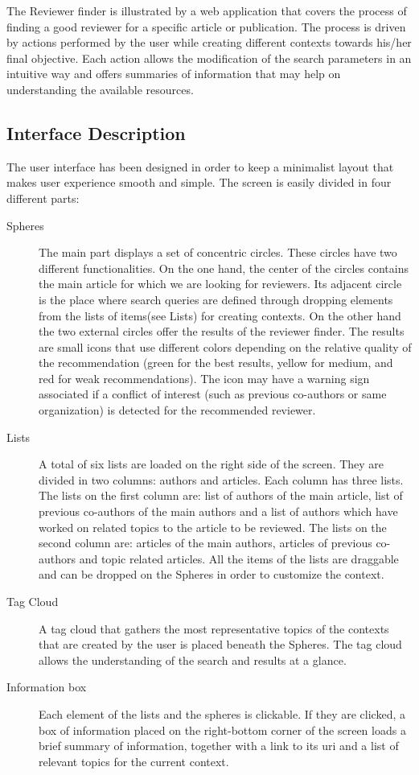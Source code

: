 The Reviewer finder is illustrated by a web application that covers the process
of finding a good reviewer for a specific article or publication. The process is
driven by actions performed by the user while creating different contexts
towards his/her final objective. Each action allows the modification of the
search parameters in an intuitive way and offers summaries of information that
may help on understanding the available resources.\\
\subsection{Interface Description}
The user interface has been designed in order to keep a minimalist layout that
makes user experience smooth and simple. The screen is easily divided in four
different parts:
\begin{description}
\item[Spheres]The main part displays a set of concentric circles. These circles
have two different functionalities. On the one hand, the center of the circles
contains the main article for which we are looking for reviewers. Its adjacent
circle is the place where search queries are defined through dropping elements
from the lists of items(see Lists) for creating contexts. On the other hand the
two external circles offer the results of the reviewer finder. The results are
small icons that use different colors depending on the relative quality of the
recommendation (green for the best results, yellow for medium, and red for weak
recommendations). The icon may have a warning sign associated if a conflict of
interest (such as previous co-authors or same organization) is detected for the
recommended reviewer.
\item[Lists]A total of six lists are loaded on the right side of the screen.
They are divided in two columns: authors and articles. Each column has three
lists. The lists on the first column are: list of authors of the main article,
list of previous co-authors of the main authors and a list of authors which have
worked on related topics to the article to be reviewed. The lists on the second
column are: articles of the main authors, articles of previous co-authors and
topic related articles. All the items of the lists are draggable and can be
dropped on the Spheres in order to customize the context.
\item[Tag Cloud]A tag cloud that gathers the most representative topics of the
contexts that are created by the user is placed beneath the Spheres. The tag
cloud allows the understanding of the search and results at a glance.
\item[Information box]Each element of the lists and the spheres is clickable. If
they are clicked, a box of information placed on the right-bottom corner of the
screen loads a brief summary of information, together with a link to its uri and
a list of relevant topics for the current context.
\end{description}
